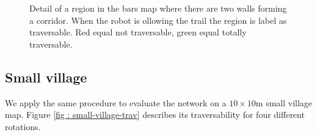 \documentclass[../document.tex]{subfiles}
\begin{document}
\begin{figure} [htbp]
\begin{subfigure}[b]{0.23\textwidth}
  \end{subfigure}
  \caption{Detail of a region in the bars map where there are two walls forming a corridor. When the robot is ollowing the trail the region is label as traversable. Red equal not traversable, green equal totally traversable. }
  \label{fig : bars-tunnel-trav}
  \end{figure}

\subsection{Small village}
We apply the same procedure to evaluate the network on a $10\times10$m small village map. Figure \ref{fig : small-village-trav} describes its traversability for four different rotations.
\end{document}
